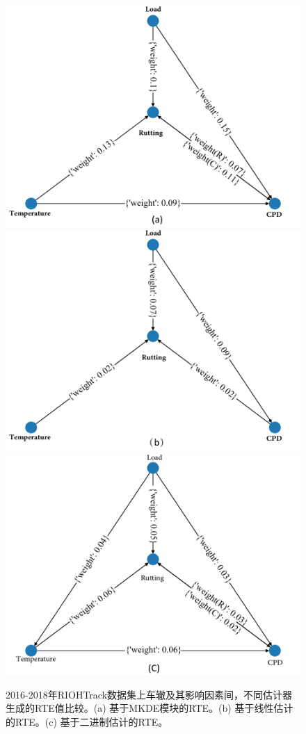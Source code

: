 \begin{figure}[H]
\begin{center}
\includegraphics[scale=0.3]{./ch3/fig3_16.pdf}
\includegraphics[scale=0.3]{./ch3/fig3_17.pdf}
\includegraphics[scale=0.3]{./ch3/fig3_18.pdf}
\caption{2016-2018年RIOHTrack数据集上车辙及其影响因素间，不同估计器生成的RTE值比较。(a) 基于MKDE模块的RTE。(b) 基于线性估计的RTE。(c) 基于二进制估计的RTE。} \label{Figure11}
\end{center}
\end{figure}

